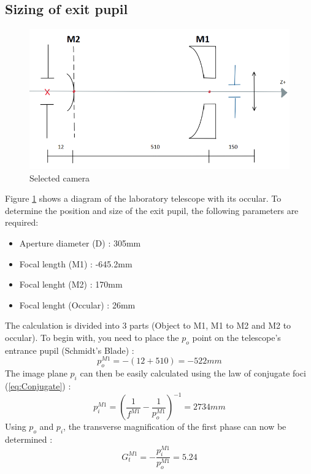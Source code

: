 \subsection{Sizing of exit pupil}
\begin{figure}[H]
    \centering
    \includegraphics[scale=0.9]{assets/figures/Optical Design/Design_Mask.png}
    \caption{Selected camera}
    \label{fig:Opti_Mask_Diagram}
\end{figure}
Figure \ref{fig:Opti_Mask_Diagram} shows a diagram of the laboratory telescope with its occular.
To determine the position and size of the exit pupil, the following parameters are required:
\begin{itemize}
    \item Aperture diameter (D) : 305mm
    \item Focal length (M1) : -645.2mm
    \item Focal lenght (M2) : 170mm
    \item Focal lenght (Occular) : 26mm
\end{itemize}
The calculation is divided into 3 parts (Object to M1, M1 to M2 and M2 to occular).
To begin with, you need to place the $p_o$ point on the telescope's entrance pupil (Schmidt's Blade) :
\begin{equation}
    p_o^{M1} = -(12+510) = -522mm
\end{equation}
The image plane $p_i$ can then be easily calculated using the law of conjugate foci (\ref{eq:Conjugate}) :
\begin{equation}
    p_i^{M1} = \left(\frac{1}{f^{M1}}-\frac{1}{p_o^{M1}}\right)^{-1} = 2734 mm
\end{equation}
Using $p_o$ and $p_i$, the transverse magnification of the first phase can now be determined :
\begin{equation}
    G_t^{M1} = -\frac{p_i^{M1}}{p_o^{M1}} = 5.24
\end{equation}
